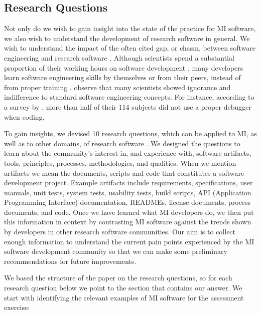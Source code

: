 \documentclass[11pt]{article}
\begin{document}
\subsection{Research Questions} \label{sec_motivation}

Not only do we wish to gain insight into the state of the practice for MI
software, we also wish to understand the development of research software in
general. We wish to understand the impact of the often cited gap, or chasm,
between software engineering and research software \citep{Kelly2007,
Storer2017}. Although scientists spend a substantial proportion of their working
hours on software development \citep{Hannay2009, Prabhu2011}, many developers
learn software engineering skills by themselves or from their peers, instead of
from proper training \citep{Hannay2009}. \citet{Hannay2009} observe that many
scientists showed ignorance and indifference to standard software engineering
concepts. For instance, according to a survey by \citet{Prabhu2011}, more than
half of their 114 subjects did not use a proper debugger when coding.

To gain insights, we devised 10 research questions, which can be applied to MI,
as well as to other domains, of research software \citep{SmithEtAl2021,
SmithAndMichalski2022}.  We designed the questions to learn about the
community's interest in, and experience with, software artifacts, tools,
principles, processes, methodologies, and qualities.  When we mention artifacts
we mean the documents, scripts and code that constitutes a software development
project. Example artifacts include requirements, specifications, user manuals,
unit tests, system tests, usability tests, build scripts, API (Application
Programming Interface) documentation, READMEs, license documents, process
documents, and code.  Once we have learned what MI developers do, we then put
this information in context by contrasting MI software against the trends shown
by developers in other research software communities.  Our aim is to collect
enough information to understand the current pain points experienced by the MI
software development community so that we can make some preliminary
recommendations for future improvements. 

We based the structure of the paper on the research questions, so for each
research question below we point to the section that contains our answer.  We
start with identifying the relevant examples of MI software for the assessment
exercise:
\end{document}
